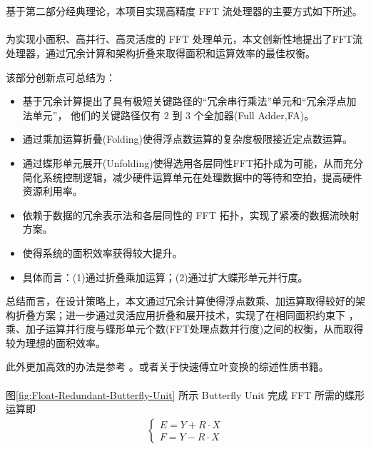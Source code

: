 \section{}

\subsection{}

基于第二部分经典理论，本项目实现高精度 FFT 流处理器的主要方式如下所述。
\paragraph{}
为实现小面积、高并行、高灵活度的 FFT 处理单元，本文创新性地提出了FFT流处理器，通过冗余计算和架构折叠来取得面积和运算效率的最佳权衡。

该部分创新点可总结为：
\begin{itemize}
    \item   基于冗余计算提出了具有极短关键路径的``冗余串行乘法''单元和``冗余浮点加法单元''，
    他们的关键路径仅有 $2$ 到 $3$ 个全加器(Full Adder,FA)。
    \item   通过乘加运算折叠(Folding)使得浮点数运算的复杂度极限接近定点数运算。
    \item   通过蝶形单元展开(Unfolding)使得选用各层同性FFT拓扑成为可能，从而充分简化系统控制逻辑，减少硬件运算单元在处理数据中的等待和空拍，提高硬件资源利用率。
    \item   依赖于数据的冗余表示法和各层同性的 FFT 拓扑，实现了紧凑的数据流映射方案。
    \item   使得系统的面积效率获得较大提升。
    \item   具体而言：(1)通过折叠乘加运算；(2)通过扩大蝶形单元并行度。
\end{itemize}

总结而言，在设计策略上，本文通过冗余计算使得浮点数乘、加运算取得较好的架构折叠方案；进一步通过灵活应用折叠和展开技术，实现了在相同面积约束下
，乘、加子运算并行度与蝶形单元个数(FFT处理点数并行度)之间的权衡，从而取得较为理想的面积效率。

此外更加高效的办法是参考 \cite{Li2010}。或者关于快速傅立叶变换的综述性质书籍\cite{Nussbaumer1982}。

\paragraph{}
图\ref{fig:Float-Redundant-Butterfly-Unit} 所示 Butterfly Unit 完成 FFT 所需的蝶形运算即
\begin{eqnarray*}
    \left\{
        \begin{aligned}
        E=Y+R\cdot X\\
        F=Y-R\cdot X
        \end{aligned}
        \right.
\end{eqnarray*}

